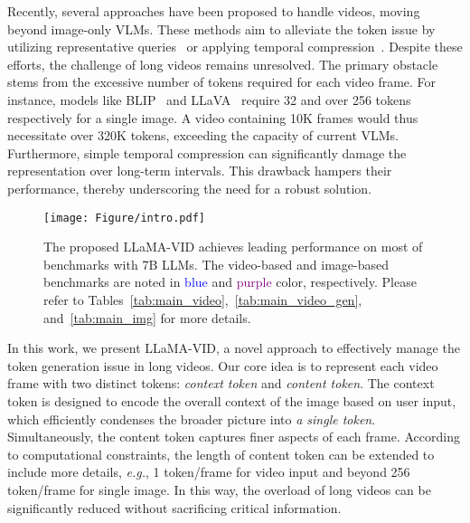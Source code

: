 Recently, several approaches have been proposed to handle videos, moving beyond image-only VLMs.
These methods aim to alleviate the token issue by utilizing representative queries~\cite{videochat,videollama} or applying temporal compression~\cite{videochatgpt,luo2023valley}.
Despite these efforts, the challenge of long videos remains unresolved. 
The primary obstacle stems from the excessive number of tokens required for each video frame. 
For instance, models like BLIP~\cite{blip2,instructblip} and LLaVA~\cite{llava} require 32 and over 256 tokens respectively for a single image. 
A video containing 10K frames would thus necessitate over 320K tokens, exceeding the capacity of current VLMs. 
Furthermore, simple temporal compression can significantly damage the representation over long-term intervals. 
This drawback hampers their performance, thereby underscoring the need for a robust solution.

\begin{figure}[t!]
\centering
\texttt{[image: Figure/intro.pdf]} 
\caption{
The proposed LLaMA-VID achieves leading performance on most of benchmarks with 7B LLMs. The video-based and image-based benchmarks are noted in \textcolor{blue}{blue} and \textcolor{purple}{purple} color, respectively.
Please refer to Tables~\ref{tab:main_video},~\ref{tab:main_video_gen}, and~\ref{tab:main_img} for more details.
}
\label{fig:intro}
\end{figure}

In this work, we present LLaMA-VID, a novel approach to effectively manage the token generation issue in long videos. 
Our core idea is to represent each video frame with two distinct tokens: {\em context token} and {\em content token}. 
The context token is designed to encode the overall context of the image based on user input, which efficiently condenses the broader picture into {\em a single token}. 
Simultaneously, the content token captures finer aspects of each frame. 
According to computational constraints, the length of content token can be extended to include more details, {\em e.g.}, 1 token/frame for video input and beyond 256 token/frame for single image. 
In this way, the overload of long videos can be significantly reduced without sacrificing critical information.

